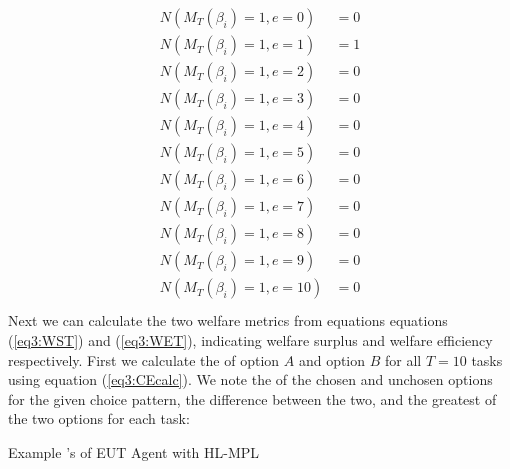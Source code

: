 \documentclass[../main.tex]{subfiles}
\begin{document}
\begin{align}
	\label{eq3:example_NMB}
	\begin{split}
		N( M_T(\beta_i) = 1, e = 0 )  &= 0 \\
		N( M_T(\beta_i) = 1, e = 1 )  &= 1 \\
		N( M_T(\beta_i) = 1, e = 2 )  &= 0 \\
		N( M_T(\beta_i) = 1, e = 3 )  &= 0 \\
		N( M_T(\beta_i) = 1, e = 4 )  &= 0 \\
		N( M_T(\beta_i) = 1, e = 5 )  &= 0 \\
		N( M_T(\beta_i) = 1, e = 6 )  &= 0 \\
		N( M_T(\beta_i) = 1, e = 7 )  &= 0 \\
		N( M_T(\beta_i) = 1, e = 8 )  &= 0 \\
		N( M_T(\beta_i) = 1, e = 9 )  &= 0 \\
		N( M_T(\beta_i) = 1, e = 10 ) &= 0 \\
	\end{split}
\end{align}
\noindent Next we can calculate the two welfare metrics from equations equations (\ref{eq3:WST}) and (\ref{eq3:WET}), indicating welfare surplus and welfare efficiency respectively.
First we calculate the {\CE} of option $A$ and option $B$ for all $T = 10$ tasks using equation (\ref{eq3:CEcalc}).
We note the {\CE} of the chosen and unchosen options for the given choice pattern, the difference between the two, and the greatest {\CE} of the two options for each task:

\begin{table}[ht]
	\centering
	\setlength{\tabcolsep}{1pt}
	\caption{ Example {\CE}'s of EUT Agent with HL-MPL}
	\label{tb:example_CE}
	\begin{adjustbox}{width=1\textwidth}
	\end{adjustbox}
\end{table}
\end{document}
